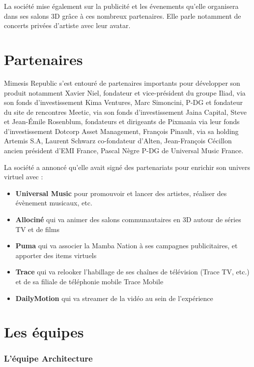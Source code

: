La société mise également sur la publicité et les évenements qu'elle organisera
dans ses salons 3D grâce à ces nombreux partenaires. Elle parle notamment de
concerts privées d'artiste avec leur avatar.

\section{Partenaires}

Mimesis Republic s'est entouré de partenaires importants pour développer son
produit notamment Xavier Niel, fondateur et vice-président du groupe Iliad, via
son fonds d’investissement Kima Ventures, Marc Simoncini, P-DG et fondateur du
site de rencontres Meetic, via son fonds d'investissement Jaina Capital, Steve
et Jean-Émile Rosenblum, fondateurs et dirigeants de Pixmania via leur fonds
d'investissement Dotcorp Asset Management, François Pinault, via sa holding
Artemis S.A, Laurent Schwarz co-fondateur d'Alten, Jean-François Cécillon ancien
président d'EMI France, Pascal Nègre P-DG de Universal Music France.

La société a annoncé qu'elle avait signé des partenariats pour enrichir son
univers virtuel avec :
\begin{itemize}
\item[\textbullet]\textbf{Universal Music} pour promouvoir et lancer des artistes,
  réaliser des évènement musicaux, etc.
\item[\textbullet]\textbf{Allociné} qui va animer des salons communautaires en
  3D autour de séries TV et de films
\item[\textbullet]\textbf{Puma} qui va associer la Mamba Nation à ses
  campagnes publicitaires, et apporter des items virtuels
\item[\textbullet]\textbf{Trace} qui va relooker l'habillage de ses chaînes de
  télévision (Trace TV, etc.) et de sa filiale de téléphonie mobile Trace
  Mobile
\item[\textbullet]\textbf{DailyMotion} qui va streamer de la vidéo au sein de
  l’expérience
\end{itemize}


\section{Les équipes}

\subsubsection{L'équipe Architecture}


